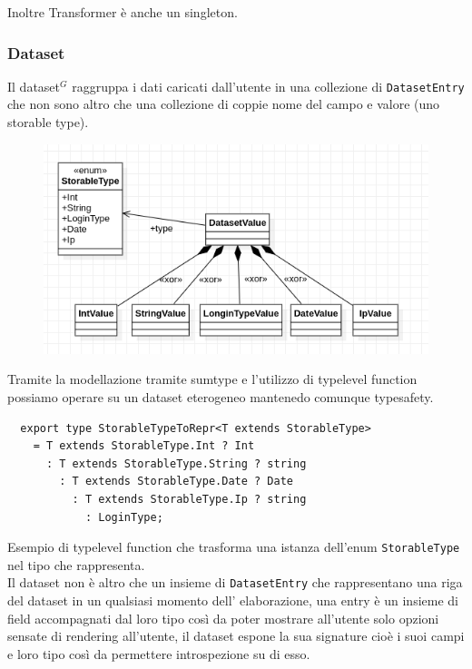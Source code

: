 Inoltre Transformer è anche un singleton.

\subsubsection{Dataset}
Il dataset$^{G}$ raggruppa i dati caricati dall'utente in una collezione di
\texttt{DatasetEntry} che non sono altro che una collezione di coppie nome del
campo e valore (uno storable type). \\
\begin{figure}[H]
  \centering
  \includegraphics[scale=0.65]{../../assets/classi_uml/datasetentrypng.png}
\end{figure}
Tramite la modellazione tramite sumtype e l'utilizzo di typelevel function
possiamo operare su un dataset eterogeneo mantenedo comunque typesafety.
\begin{verbatim}
  export type StorableTypeToRepr<T extends StorableType>
    = T extends StorableType.Int ? Int
      : T extends StorableType.String ? string
        : T extends StorableType.Date ? Date
          : T extends StorableType.Ip ? string
            : LoginType;
\end{verbatim}
Esempio di typelevel function che trasforma una istanza dell'enum
\texttt{StorableType} nel tipo che rappresenta.
\\

\noindent
Il dataset non è altro che un insieme di \texttt{DatasetEntry} che rappresentano
una riga del dataset in un qualsiasi momento dell' elaborazione, una entry è un
insieme di field accompagnati dal loro tipo così da poter mostrare all'utente
solo opzioni sensate di rendering all'utente, il dataset espone la sua signature
cioè i suoi campi e loro tipo così da permettere introspezione su di esso.\\

